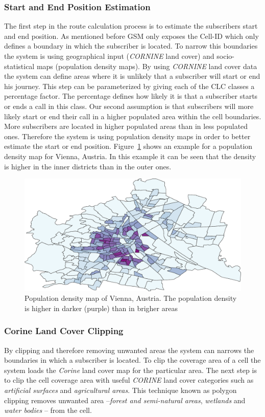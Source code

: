 \documentclass[master,english]{hgbthesis}
\begin{document}
\subsubsection{Start and End Position Estimation}
\label{sec:startandend}
The first step in the route calculation process is to estimate the subscribers start and end position. As mentioned before GSM only exposes the Cell-ID which only defines a boundary in which the subscriber is located. To narrow this boundaries the system is using geographical input (\emph{CORNINE} land cover) and socio-statistical maps (population density maps).
By using \emph{CORNINE} land cover data the system can define areas where it is unlikely that a subscriber will start or end his journey. This step can be parameterized by giving each of the CLC classes a percentage factor. The percentage defines how likely it is that a subscriber starts or ends a call in this class.
Our second assumption is that subscribers will more likely start or end their call in a higher populated area within the cell boundaries. More subscribers are located in higher populated areas than in less populated ones. Therefore the system is using population density maps in order to better estimate the start or end position. Figure~\ref{fig:pop_vienna} shows an example for a population density map for Vienna, Austria. In this example it can be seen that the density is higher in the inner districts than in the outer ones.
\begin{figure}
	\centering
	\includegraphics[width=0.7\linewidth]{./images/pop_vienna}
	\caption{Population density map of Vienna, Austria. The population density is higher in darker (purple) than in brigher areas}
	\label{fig:pop_vienna}
\end{figure}
\subsubsection{Corine Land Cover Clipping}
By clipping and therefore removing unwanted areas the system can narrows the boundaries in which a subscriber is located. To clip the coverage area of a cell the system loads the \emph{Corine} land cover map for the particular area. The next step is to clip the cell coverage area with useful \emph{CORINE} land cover categories such as \emph{artificial surfaces} and \emph{agricultural areas}. This technique known as polygon clipping removes unwanted area --\emph{forest and semi-natural areas}, \emph{wetlands} and \emph{water bodies} -- from the cell.
\end{document}
